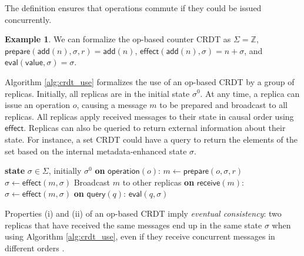 \documentclass[acmsmall,nonacm]{acmart}
\newcommand{\mb}[1]{\ensuremath{\mathbb{#1}}}
\newcommand{\msf}[1]{\ensuremath{\mathsf{#1}}}
\newcommand{\Z}{\mb{Z}}
\theoremstyle{plain}
\theoremstyle{definition}
\newtheorem{myex}[mythm]{Example}
\begin{document}
The definition ensures that operations commute if they could be issued concurrently.

\begin{myex}
We can formalize the op-based counter CRDT as $\Sigma = \Z$, $\msf{prepare}(\msf{add}(n), \sigma, r) = \msf{add}(n)$, $\msf{effect}(\msf{add}(n), \sigma) = n + \sigma$, and $\msf{eval}(\msf{value}, \sigma) = \sigma$.
\end{myex}


Algorithm \ref{alg:crdt_use} formalizes the use of an op-based CRDT by a group of replicas.  Initially, all replicas are in the initial state $\sigma^0$.  At any time, a replica can issue an operation $o$, causing a message $m$ to be prepared and broadcast to all replicas.  All replicas apply received messages to their state in causal order using $\msf{effect}$.  Replicas can also be queried to return external information about their state.  For instance, a set CRDT could have a query to return the elements of the set based on the internal metadata-enhanced state $\sigma$.

\begin{algorithm}[ht!]
\begin{algorithmic}[1]
\State \textbf{state} $\sigma \in \Sigma$, initially $\sigma^0$
\State \textbf{on} $\msf{operation}(o)$:
\Indent
  \State $m \gets \msf{prepare}(o, \sigma, r)$
  \State $\sigma \gets \msf{effect}(m, \sigma)$
  \State Broadcast $m$ to other replicas
\EndIndent
\State \textbf{on} $\msf{receive}(m)$:
\Indent
  \State $\sigma \gets \msf{effect}(m, \sigma)$
\EndIndent
  \State \textbf{on} $\msf{query}(q)$:
\Indent
  \State \Return $\msf{eval}(q, \sigma)$
\EndIndent
\end{algorithmic}
\caption{Distributed algorithm describing the use of an op-based CRDT by a replica $r$, based on \cite[Algorithm 1]{pure_op_based_crdts_extended} \cite{crdt_survey_2011}.  Messages are assumed to be received in causal order.%
}
\label{alg:crdt_use}
\end{algorithm}

Properties (i) and (ii) of an op-based CRDT imply \textit{eventual consistency}: two replicas that have received the same messages end up in the same state $\sigma$ when using Algorithm \ref{alg:crdt_use}, even if they receive concurrent messages in different orders \cite[Proposition 2.2]{crdt_survey_2011}.
\end{document}

